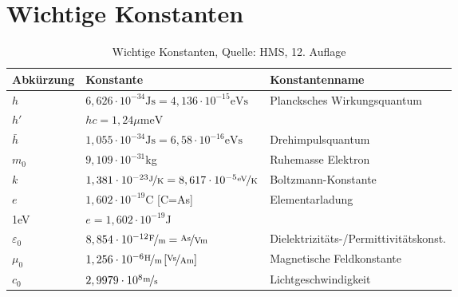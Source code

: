 \chapter{Wichtige Konstanten}
	\begin{table}[ht]
	\begin{tabularx}{\textwidth}{lll}
	Abkürzung & Konstante & Konstantenname\\
	\toprule
	$h$ & $6,626\cdot10^{-34}\mathrm{Js}=4,136\cdot10^{-15}\mathrm{eVs}$ & Plancksches Wirkungsquantum\\
	\midrule
	$h'$ & $hc=1,24\mu\mathrm{meV}$ & \\
	\midrule
	$\bar{h}$ & $1,055\cdot10^{-34}\mathrm{Js}=6,58\cdot10^{-16}\mathrm{eVs}$ & Drehimpulsquantum\\
	\midrule
	$m_0$ & $9,109\cdot10^{-31}$kg & Ruhemasse Elektron\\
	\midrule
	$k$ & $1,381\cdot10^{-23}\nicefrac{\mathrm{J}}{\mathrm{K}}=8,617\cdot10^{-5}\nicefrac{\mathrm{eV}}{\mathrm{K}}$& Boltzmann-Konstante\\
	\midrule
	$e$ & $1,602\cdot10^{-19}$C [C=As] & Elementarladung\\
	\midrule
	1eV & $e=1,602\cdot10^{-19}$J & \\
	\midrule
	$\varepsilon_0$ & $8,854\cdot10^{-12}\nicefrac{\mathrm{F}}{\mathrm{m}}=\nicefrac{\mathrm{As}}{\mathrm{Vm}}$ & Dielektrizitäts-/Permittivitätskonst.\\
	\midrule
	$\mu_0$ & $1,256\cdot10^{-6}\nicefrac{\mathrm{H}}{\mathrm{m}} \left[\nicefrac{\mathrm{Vs}}{\mathrm{Am}}\right]$&Magnetische Feldkonstante\\
	\midrule
	$c_0$ & $2,9979\cdot10^8\nicefrac{\mathrm{m}}{\mathrm{s}}$ & Lichtgeschwindigkeit\\
	\bottomrule
	\end{tabularx}
	\label{Konstanten}
	\caption{Wichtige Konstanten, Quelle: HMS, 12. Auflage}
	\end{table}
